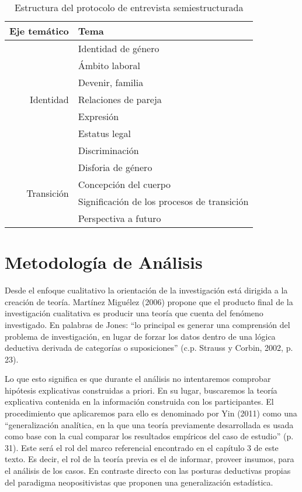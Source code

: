 \begin{table}[]
\centering
\caption{Estructura del protocolo de entrevista semiestructurada}
\label{tab:protocolo}
\begin{tabularx}{\textwidth}{@{}rX@{}}
\toprule
Eje temático                & Tema                                        \\ \midrule
\multirow{7}{*}{Identidad}  & Identidad de género                         \\
                            & Ámbito laboral                              \\
                            & Devenir, familia                            \\
                            & Relaciones de pareja                        \\
                            & Expresión                                   \\
                            & Estatus legal                               \\
                            & Discriminación                              \\
\midrule
\multirow{4}{*}{Transición} & Disforia de género                          \\
                            & Concepción del cuerpo                       \\
                            & Significación de los procesos de transición \\
                            & Perspectiva a futuro                        \\
\bottomrule
\end{tabularx}
\end{table}

\section{Metodología de Análisis}
Desde el enfoque cualitativo la orientación de la investigación está dirigida a
la creación de teoría.
Martínez Miguélez (2006) propone que el producto final de la investigación
cualitativa es producir una teoría que cuenta del fenómeno investigado.
En palabras de Jones: “lo principal es generar una comprensión del problema de
investigación, en lugar de forzar los datos dentro de una lógica deductiva
derivada de categorías o suposiciones” (c.p. Strauss y Corbin, 2002, p. 23).

Lo que esto significa es que durante el análisis no intentaremos comprobar
hipótesis explicativas construidas a priori.
En su lugar, buscaremos la teoría explicativa contenida en la información
construida con los participantes.
El procedimiento que aplicaremos para ello es denominado por Yin (2011) como una
“generalización analítica, en la que una teoría previamente desarrollada es
usada como base con la cual comparar los resultados empíricos del caso de
estudio” (p. 31).
Este será el rol del marco referencial encontrado en el capítulo 3 de este
texto.
Es decir, el rol de la teoría previa es el de informar, proveer insumos, para el
análisis de los casos.
En contraste directo con las posturas deductivas propias del paradigma
neopositivistas que proponen una generalización estadística.

